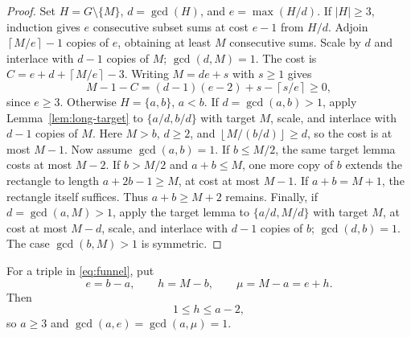 \documentclass[11pt,a4paper,reqno]{amsart}
\theoremstyle{definition}
\theoremstyle{remark}
\newcommand{\ceil}[1]{\left\lceil #1\right\rceil}
\newcommand{\floor}[1]{\left\lfloor #1\right\rfloor}
\begin{document}
\begin{proof}
Set $H=G\setminus\{M\}$, $d=\gcd(H)$, and $e=\max(H/d)$.
If $|H|\ge3$, induction gives $e$ consecutive subset sums at cost $e-1$
from $H/d$. Adjoin $\ceil{M/e}-1$ copies of $e$, obtaining at least $M$
consecutive sums. Scale by $d$ and interlace with $d-1$ copies of $M$;
$\gcd(d,M)=1$. The cost is $C=e+d+\ceil{M/e}-3$. Writing $M=de+s$
with $s\ge1$ gives
\[
 M-1-C=(d-1)(e-2)+s-\ceil{s/e}\ge0,
\]
since $e\ge3$.
Otherwise $H=\{a,b\}$, $a<b$. If $d=\gcd(a,b)>1$, apply
Lemma~\ref{lem:long-target} to $\{a/d,b/d\}$ with target $M$, scale,
and interlace with $d-1$ copies of $M$. Here $M>b$, $d\ge2$, and
$\floor{M/(b/d)}\ge d$, so the cost is at most $M-1$.
Now assume $\gcd(a,b)=1$. If $b\le M/2$, the same target lemma costs
at most $M-2$. If $b>M/2$ and $a+b\le M$, one more copy of $b$ extends
the rectangle to length $a+2b-1\ge M$, at cost at most $M-1$.
If $a+b=M+1$, the rectangle itself suffices. Thus $a+b\ge M+2$ remains.
Finally, if $d=\gcd(a,M)>1$, apply the target lemma to $\{a/d,M/d\}$
with target $M$, at cost at most $M-d$, scale, and interlace with $d-1$
copies of $b$; $\gcd(d,b)=1$. The case $\gcd(b,M)>1$ is symmetric.
\end{proof}
For a triple in \eqref{eq:funnel}, put
\begin{equation}\label{eq:triple-notation}
 e=b-a,\qquad h=M-b,\qquad\mu=M-a=e+h.
\end{equation}
Then
\begin{equation}\label{eq:h-range}
 1\le h\le a-2,
\end{equation}
so $a\ge3$ and $\gcd(a,e)=\gcd(a,\mu)=1$.
\end{document}
